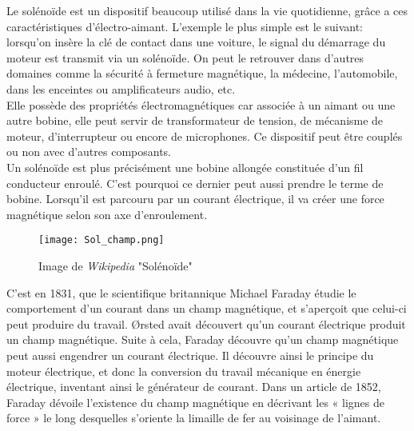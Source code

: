 
Le solénoïde est un dispositif beaucoup utilisé dans la vie quotidienne, grâce a ces caractéristiques d’électro-aimant. L’exemple le plus simple est le suivant: lorsqu'on insère la clé de contact dans une voiture, le signal du démarrage du moteur est transmit via un solénoïde. On peut le retrouver dans d'autres domaines comme la sécurité à fermeture magnétique, la médecine, l'automobile, dans les enceintes ou amplificateurs audio, etc.\\
Elle possède des propriétés électromagnétiques car associée à un aimant ou une autre bobine, elle peut servir de transformateur de tension, de mécanisme de moteur, d'interrupteur ou encore de microphones. Ce dispositif peut être couplés ou non avec d'autres composants.\\
Un solénoïde est plus précisément une bobine allongée constituée d'un fil conducteur enroulé. C'est pourquoi ce dernier peut aussi prendre le terme de bobine. Lorsqu'il est parcouru par un courant électrique, il va créer une force magnétique selon son axe d’enroulement.
\begin{figure}[H]
  \centering
    \texttt{[image: Sol\_champ.png]}
    \caption{Image de \emph{Wikipedia} "Solénoïde"}
\end{figure}


C'est en 1831, que le scientifique britannique Michael Faraday étudie le comportement d'un courant dans un champ magnétique, et s'aperçoit que celui-ci peut produire du travail. Ørsted avait découvert qu'un courant électrique produit un champ magnétique. Suite à cela, Faraday découvre qu'un champ magnétique peut aussi engendrer un courant électrique. Il découvre ainsi le principe du moteur électrique, et donc la conversion du travail mécanique en énergie électrique, inventant ainsi le générateur de courant. Dans un article de 1852, Faraday dévoile l'existence du champ magnétique en décrivant les « lignes de force » le long desquelles s'oriente la limaille de fer au voisinage de l'aimant.\\

